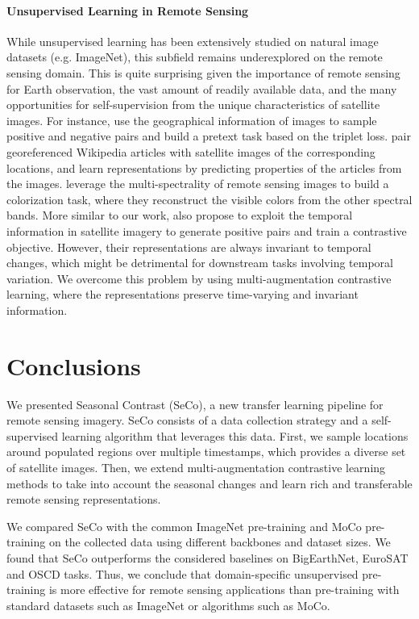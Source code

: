 \documentclass[10pt,twocolumn,letterpaper]{article}
\newcommand{\Methodname}[0]{Seasonal Contrast}
\newcommand{\methodname}[0]{SeCo}
\begin{document}
\vspace{-1em}\paragraph{Unsupervised Learning in Remote Sensing}
While unsupervised learning has been extensively studied on natural image datasets (e.g. ImageNet), this subfield remains underexplored on the remote sensing domain. This is quite surprising given the importance of remote sensing for Earth observation, the vast amount of readily available data, and the many opportunities for self-supervision from the unique characteristics of satellite images. For instance, \citet{jean2019tile2vec} use the geographical information of images to sample positive and negative pairs and build a pretext task based on the triplet loss. \citet{uzkent2019learning} pair georeferenced Wikipedia articles with satellite images of the corresponding locations, and learn representations by predicting properties of the articles from the images. \citet{vincenzi2020color} leverage the multi-spectrality of remote sensing images to build a colorization task, where they reconstruct the visible colors from the other spectral bands. More similar to our work, \citet{ayush2020geography} also propose to exploit the temporal information in satellite imagery to generate positive pairs and train a contrastive objective. However, their representations are always invariant to temporal changes, which might be detrimental for downstream tasks involving temporal variation. We overcome this problem by using multi-augmentation contrastive learning, where the representations preserve time-varying and invariant information.

\section{Conclusions}
We presented \Methodname{} (\methodname{}), a new transfer learning pipeline for remote sensing imagery. \methodname{} consists of a data collection strategy and a self-supervised learning algorithm that leverages this data. First, we sample locations around populated regions over multiple timestamps, which provides a diverse set of satellite images. Then, we extend multi-augmentation contrastive learning methods to take into account the seasonal changes and learn rich and transferable remote sensing representations.

We compared \methodname{} with the common ImageNet pre-training and MoCo pre-training on the collected data using different backbones and dataset sizes. We found that \methodname{} outperforms the considered baselines on BigEarthNet, EuroSAT and OSCD tasks. Thus, we conclude that domain-specific unsupervised pre-training is more effective for remote sensing applications than pre-training with standard datasets such as ImageNet or algorithms such as MoCo.



{\small


}
\end{document}

